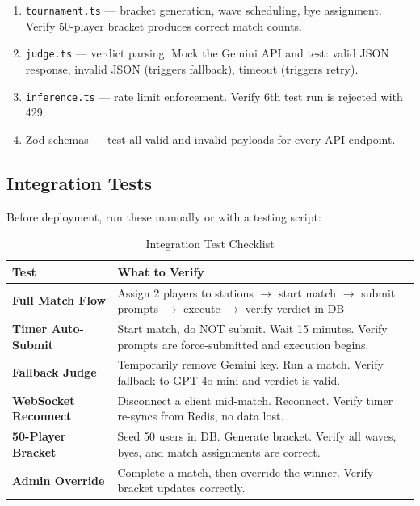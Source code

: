 \documentclass[11pt, a4paper]{article}
\begin{document}
\begin{enumerate}[leftmargin=1.5cm, itemsep=3pt]
    \item \texttt{tournament.ts} --- bracket generation, wave scheduling, bye assignment. Verify 50-player bracket produces correct match counts.
    \item \texttt{judge.ts} --- verdict parsing. Mock the Gemini API and test: valid JSON response, invalid JSON (triggers fallback), timeout (triggers retry).
    \item \texttt{inference.ts} --- rate limit enforcement. Verify 6th test run is rejected with 429.
    \item Zod schemas --- test all valid and invalid payloads for every API endpoint.
\end{enumerate}

\subsection{Integration Tests}

Before deployment, run these manually or with a testing script:

\begin{table}[H]
\centering
\small\renewcommand{\arraystretch}{1.3}
\begin{tabularx}{\textwidth}{>{\bfseries}l X}
\toprule
Test & What to Verify \\
\midrule
Full Match Flow      & Assign 2 players to stations $\to$ start match $\to$ submit prompts $\to$ execute $\to$ verify verdict in DB \\
Timer Auto-Submit    & Start match, do NOT submit. Wait 15 minutes. Verify prompts are force-submitted and execution begins. \\
Fallback Judge       & Temporarily remove Gemini key. Run a match. Verify fallback to GPT-4o-mini and verdict is valid. \\
WebSocket Reconnect  & Disconnect a client mid-match. Reconnect. Verify timer re-syncs from Redis, no data lost. \\
50-Player Bracket    & Seed 50 users in DB. Generate bracket. Verify all waves, byes, and match assignments are correct. \\
Admin Override       & Complete a match, then override the winner. Verify bracket updates correctly. \\
\bottomrule
\end{tabularx}
\caption{Integration Test Checklist}
\end{table}
\end{document}
